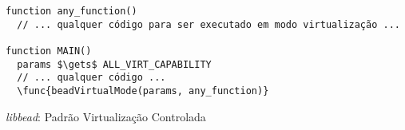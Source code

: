 \begin{pseudocode}
\begin{lstlisting}[language=pseudocode, style=pseudocode]
function any_function()
  // ... qualquer código para ser executado em modo virtualização ...

function MAIN()
  params $\gets$ ALL_VIRT_CAPABILITY
  // ... qualquer código ...
  \func{beadVirtualMode(params, any_function)}

\end{lstlisting}

  \caption{\emph{libbead}: Padrão Virtualização Controlada}
  \label{alg:libBeadvirtMode}
\end{pseudocode}
